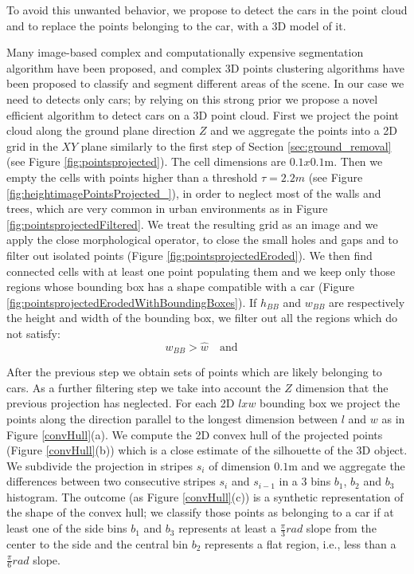 To avoid this unwanted behavior, we propose to detect the cars in the point cloud and to replace the points belonging to the car, with a 3D model of it.

Many image-based complex and computationally expensive segmentation algorithm have been proposed, and complex 3D points clustering algorithms have been proposed to  classify and segment different areas of the scene. 
In our case we  need to detects only cars; by relying on this strong prior we propose a novel efficient algorithm to detect cars on a 3D point cloud.
First we project the point cloud along the  ground plane direction $Z$ and we aggregate the points into a 2D grid in the $XY$ plane similarly to the first step of Section \ref{sec:ground_removal} (see Figure \ref{fig:pointsprojected}). 
The cell dimensions are $0.1x0.1$m.
Then we empty the cells  with points higher than a threshold $\tau=2.2m$ (see Figure \ref{fig:heightimagePointsProjected_}), in order to neglect most of the walls and trees, which are very common in urban environments as in Figure \ref{fig:pointsprojectedFiltered}.
We treat the resulting grid as an image and we apply the close morphological operator, to close the small holes and gaps and to filter out isolated points (Figure \ref{fig:pointsprojectedEroded}).
We then find connected cells with at least one point populating them and we keep only those regions whose bounding box has a shape compatible with a car (Figure \ref{fig:pointsprojectedErodedWithBoundingBoxes}). 
If $h_{BB}$ and $w_{BB}$ are respectively the height and width of the bounding box, we filter out all the regions which do not satisfy:
\begin{equation}
 w_{BB} > \hat{w} \quad \text{and} \quad 
\end{equation}

After the previous step we obtain sets of points which are likely belonging to cars. 
As a further filtering step we take into account the $Z$ dimension that the previous projection has neglected.
For each 2D $lxw$ bounding box we project the points along the direction parallel to the longest dimension between $l$ and $w$ as in Figure \ref{convHull}(a).
We compute the 2D convex hull of the projected points (Figure \ref{convHull}(b)) which is a close estimate of the silhouette of the 3D object. 
We subdivide the projection in  stripes $s_i$ of dimension $0.1$m and we aggregate the differences between two consecutive stripes $s_i$ and $s_{i-1}$ in a 3 bins $b_1$, $b_2$ and $b_3$ histogram.
The outcome (as Figure \ref{convHull}(c)) is a synthetic representation of the shape of the convex hull; we classify those points as belonging to a car if at least one of the side bins $b_1$ and $b_3$ represents at least a $\frac{\pi}{3}rad$ slope from the center to the side and the central bin $b_2$ represents a flat region, i.e., less than a $\frac{\pi}{6}rad$ slope.

